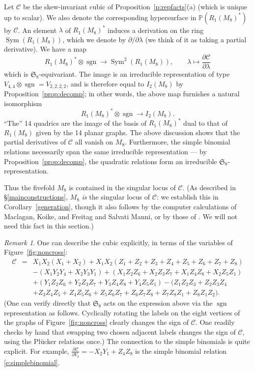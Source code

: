 \documentclass{amsart}
\theoremstyle{definition}
\theoremstyle{remark}
\newtheorem{remark}[theorem]{\it Remark}
\DeclareMathOperator{\Sym}{Sym}
\DeclareMathOperator{\sgn}{sgn}
\def\SS{\mathfrak{S}}
\def\proj{\mathbb{P}}
\def\cubic{\mathcal{C}}
\begin{document}
Let $\cubic$ be the skew-invariant cubic of Proposition~\ref{p:repfacts}(a) (which is unique up to scalar).  We also
denote the corresponding hypersurface in $\proj(R_1(M_8)^*)$ by $\cubic$.  An element $\lambda$ of $R_1(M_8)^*$
induces a derivation on the ring $\Sym(R_1(M_8))$, which we denote by $\partial/\partial \lambda$ (we think of it
as taking a partial derivative).  We have a map
\begin{displaymath}
R_1(M_8)^* \otimes \sgn \to \Sym^2(R_1(M_8)), \qquad \lambda \mapsto \frac{\partial \cubic}{\partial \lambda}
\end{displaymath}
which is $\SS_8$-equivariant.  The image is an irreducible representation of type $V_{4,4} \otimes \sgn
=V_{2,2,2,2}$, and is therefore equal to $I_2(M_8)$ by Proposition~\ref{prop:decomp}; in other words, the above map
furnishes a natural isomorphism
\begin{displaymath}
R_1(M_8)^* \otimes \sgn \to I_2(M_8).
\end{displaymath}
``The'' 14 quadrics are the image of the basis of $R_1(M_8)^*$ dual to that of $R_1(M_8)$ given by the 14 planar
graphs.
The above discussion shows that the partial derivatives of $\cubic$ all vanish on $M_8$.  Furthermore, the simple
binomial relations necessarily span the same irreducible representation --- by Proposition~\ref{prop:decomp}, the
quadratic relations form an irreducible $\SS_8$-representation.

Thus the fivefold $M_8$ is contained in the singular locus of $\cubic$.  (As described in \S \ref{mainconstructions},
$M_8$ {\em is} the singular locus of $\cubic$:  we establish this in Corollary~\ref{generation}, though it also
follows by the computer calculations of Maclagan, Koike, and
Freitag and Salvati Manni, or by those of  \cite[Prop.~2.10]{hmsv1}.  We will not need this fact in this section.)

\begin{remark}
\label{r:explicit}
One can describe the cubic explicitly, in terms of the variables of Figure~\ref{fig:noncross}:
\begin{eqnarray*}
\cubic & = & X_1X_2(X_1+X_2) +
X_1X_2(Z_1+Z_2+Z_3+Z_4+Z_5+Z_6+Z_7+Z_8) \\ & & -
(X_1Y_2Y_4 + X_2Y_3Y_1) 
+(X_1Z_2Z_6 + X_2Z_3Z_7 + X_1Z_4Z_8 + X_2Z_5Z_1)
\\ & & +(Y_1Z_2Z_6+Y_2Z_3Z_7+Y_3Z_4Z_8+Y_4Z_5Z_1) 
-(Z_1Z_2Z_3 + Z_2Z_3Z_4 \\ & & + Z_3Z_4Z_5 + Z_4Z_5Z_6 + Z_5Z_6Z_7 +Z_6Z_7Z_8+
Z_7Z_8Z_1+Z_8Z_1Z_2).
\end{eqnarray*}
(One can verify directly that $\SS_8$ acts on the expression above via the $\sgn$ representation as follows.
Cyclically rotating the labels on the eight vertices of the graphs of Figure~\ref{fig:noncross} clearly
changes the sign of $\cubic$.  One readily checks by hand that swapping two chosen adjacent labels changes
the sign of $\cubic$, using the Pl\"ucker relations once.) The connection to the simple binomials is quite
explicit.  For example, $\frac {\partial \cubic } { \partial Y_3} = - X_2 Y_1 + Z_4 Z_8$ is the  simple
binomial relation \eqref{e:simplebinomial}. 
\end{remark}
\end{document}
